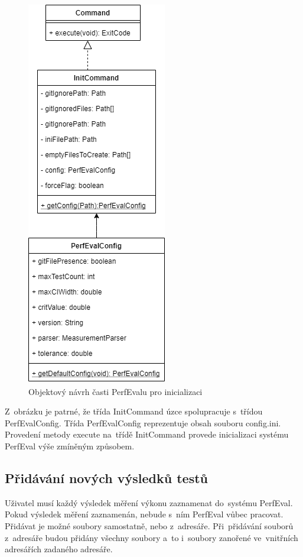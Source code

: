 \begin{figure}[h!]
    \centering
    \includegraphics[height=0.5\textheight]{../img/perfeval_init.png}
    \caption{Objektový návrh časti PerfEvalu pro inicializaci}
\end{figure}

Z~obrázku je patrné, že třída InitCommand úzce spolupracuje s~třídou PerfEvalConfig. Třída PerfEvalConfig reprezentuje
obsah souboru config.ini. Provedení metody execute na~třídě InitCommand provede inicializaci systému PerfEval výše
zmíněným způsobem.

\subsection{Přidávání nových výsledků testů}

Uživatel musí každý výsledek měření výkonu zaznamenat do~systému PerfEval. Pokud výsledek měření zaznamenán, nebude s~ním
PerfEval vůbec pracovat. Přidávat je možné soubory samostatně, nebo z~adresáře. Při~přidávání souborů z~adresáře budou
přidány všechny soubory a~to i~soubory zanořené ve~vnitřních adresářích zadaného adresáře.

